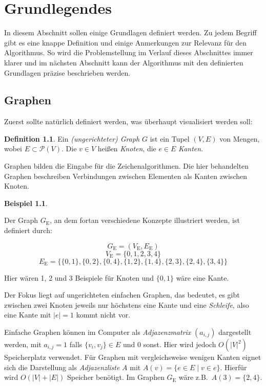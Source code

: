 \documentclass[a4paper]{scrreprt}
\theoremstyle{definition}
\newtheorem{definition}[satz]{Definition}
\newtheorem{example}[satz]{Beispiel}
\begin{document}
\chapter{Grundlegendes}
\label{chap:basics}

In diesem Abschnitt sollen einige Grundlagen definiert werden. Zu jedem Begriff gibt es eine knappe Definition und einige Anmerkungen zur Relevanz für den Algorithmus. So wird die Problemstellung im Verlauf dieses Abschnittes immer klarer und im nächsten Abschnitt kann der Algorithmus mit den definierten Grundlagen präzise beschrieben werden.

\section{Graphen}

Zuerst sollte natürlich definiert werden, was überhaupt visualisiert werden soll:

\begin{definition}
  Ein \emph{(ungerichteter) Graph} $G$ ist ein Tupel $(V, E)$ von Mengen, wobei $E \subset \mathcal{P}(V)$.
  Die $v \in V$ heißen \emph{Knoten}, die $e \in E$ \emph{Kanten}.
\end{definition}

Graphen bilden die Eingabe für die Zeichenalgorithmen. Die hier behandelten Graphen beschreiben Verbindungen zwischen Elementen als Kanten zwischen Knoten. 

\begin{example}
  \label{ex:graph}

Der Graph $G_\text{E}$, an dem fortan verschiedene Konzepte illustriert werden, ist definiert durch:

\[G_\text{E} = (V_\text{E}, E_\text{E})\]
\[V_\text{E} = \{0, 1, 2, 3, 4\}\]
\[E_\text{E} = \{\{0, 1\}, \{0, 2\}, \{0, 4\}, \{1, 2\}, \{1, 4\}, \{2, 3\}, \{2, 4\}, \{3, 4\}\}\]

Hier wären 1, 2 und 3 Beispiele für Knoten und $\{0, 1\}$ wäre eine Kante.
\end{example}

Der Fokus liegt auf ungerichteten einfachen Graphen, das bedeutet, es gibt zwischen zwei Knoten jeweils nur höchstens eine Kante und eine \emph{Schleife}, also eine Kante mit $|e| = 1$ kommt nicht vor.

Einfache Graphen können im Computer als \emph{Adjazenzmatrix} $(a_{i,j})$ dargestellt werden, mit $a_{i,j} = 1$ falls $\{v_i, v_j\} \in E$ und $0$ sonst. Hier wird jedoch $O(|V|^2)$ Speicherplatz verwendet. Für Graphen mit vergleichsweise wenigen Kanten eignet sich die Darstellung als \emph{Adjazenzliste} $A$ mit $A(v) = \{e \in E \mid v \in e\}$. Hierfür wird $O(|V| + |E|)$ Speicher benötigt. Im Graphen $G_\text{E}$ wäre z.B.\ $A(3) = \{2,4\}$. %
\end{document}
